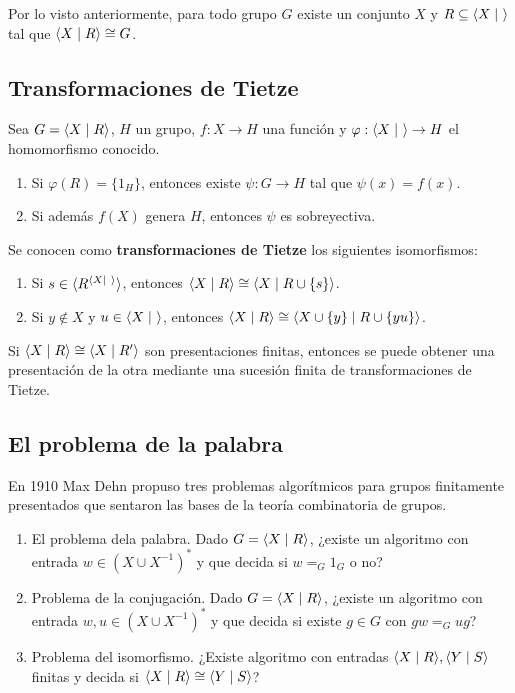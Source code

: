 \documentclass[twoside, 11pt]{article}
\begin{document}
Por lo visto anteriormente, para todo grupo $G$ existe un conjunto $X$ y $R\subseteq\langle{X\mid\ }\rangle$ tal que $\langle{X\mid R}\rangle\cong G$.
\subsection{Transformaciones de Tietze}
\begin{teorema}
Sea $G=\langle{X\mid R}\rangle$, $H$ un grupo, $f:X\to H$ una función y $\varphi:\langle{X\mid\ }\rangle\to H$ el homomorfismo conocido. 
\begin{enumerate}
\item Si $\varphi(R)=\{	1_H\}$, entonces existe $\psi:G\to H$ tal que $\psi(x)=f(x)$.
\item Si además $f(X)$ genera $H$, entonces $\psi$ es sobreyectiva.
\end{enumerate}
\end{teorema}

Se conocen como \textbf{transformaciones de Tietze} los siguientes isomorfismos:
\begin{enumerate}
\item Si $s\in \gene{R^{\gene{X\mid\ }}}$, entonces $\langle{X\mid R}\rangle\cong\langle{X\mid R\cup\{s\}}\rangle$.
\item Si $y\notin X$ y $u\in\langle{X\mid\ }\rangle$, entonces $\langle{X\mid R}\rangle\cong \langle{X\cup \{y\}\mid R\cup \{yu\}}\rangle$.
\end{enumerate}

\begin{teorema}
Si $\langle{X\mid R}\rangle\cong\langle{X\mid R'}\rangle$ son presentaciones finitas, entonces se puede obtener una presentación de la otra mediante una sucesión finita de transformaciones de Tietze.
\end{teorema}

\subsection{El problema de la palabra}
En 1910 Max Dehn propuso tres problemas algorítmicos para grupos finitamente presentados que sentaron las bases de la teoría combinatoria de grupos. 
\begin{enumerate}
\item El problema dela palabra. Dado $G=\langle{X\mid R}\rangle$, ¿existe un algoritmo con entrada $w\in (X\cup X^{-1})^*$ y que decida si $w=_G1_G$ o no?
\item Problema de la conjugación. Dado $G=\langle{X\mid R}\rangle$, ¿existe un algoritmo con entrada $w,u\in (X\cup X^{-1})^*$ y que decida si existe $g\in G$ con $gw=_G ug$?
\item Problema del isomorfismo. ¿Existe algoritmo con entradas $\langle{X\mid R}\rangle, \langle{Y\mid S}\rangle$ finitas y decida si $\langle{X\mid R}\rangle\cong \langle{Y\mid S}\rangle$?
\end{enumerate}
\end{document}
